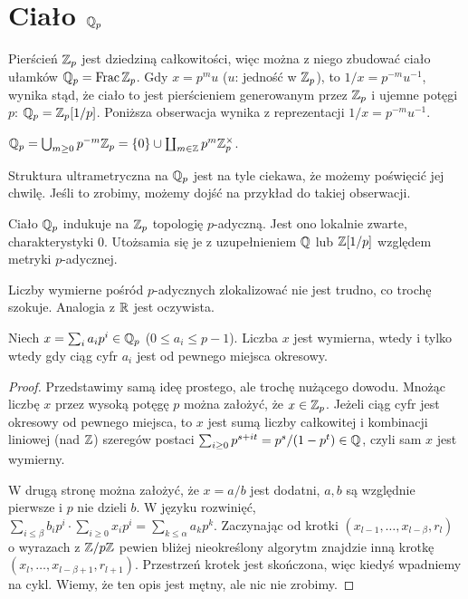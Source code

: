\section{Ciało $\mathbb Q_p$}
Pierścień  $\mathbb Z_p$ jest dziedziną całkowitości, więc można z niego zbudować ciało ułamków $\mathbb Q_p = \operatorname{Frac} \mathbb Z_p$.
Gdy $x = p^m u$ ($u$: jedność w $\mathbb Z_p$), to $1/x = p^{-m} u^{-1}$, wynika stąd, że ciało to jest pierścieniem generowanym przez $\mathbb Z_p$ i ujemne potęgi $p$: $\mathbb Q_p = \mathbb Z_p[1/p]$.
Poniższa obserwacja wynika z reprezentacji $1/x = p^{-m} u^{-1}$.

\begin{fakt}
	$\mathbb Q_p = \bigcup_{m \ge 0} p^{-m} \mathbb Z_p = \{0\} \cup \coprod_{m \in \mathbb Z} p^m \mathbb Z_p^\times$.
\end{fakt}

Struktura  ultrametryczna na $\mathbb Q_p$ jest na tyle ciekawa, że możemy poświęcić jej chwilę.
Jeśli to zrobimy, możemy dojść na przykład do takiej obserwacji.

\begin{fakt}
	Ciało $\mathbb Q_p$ indukuje na $\mathbb Z_p$ topologię $p$-adyczną.
	Jest ono lokalnie zwarte, charakterystyki $0$.
	Utożsamia się je z uzupełnieniem $\mathbb Q$ lub $\mathbb Z[1/p]$ względem metryki $p$-adycznej.
\end{fakt}

Liczby  wymierne pośród $p$-adycznych zlokalizować nie jest trudno, co trochę szokuje.
Analogia z $\mathbb R$ jest oczywista.

\begin{fakt}
	Niech $x = \sum_i a_i p^i \in \mathbb Q_p$ ($0 \le a_i \le p-1$).
	Liczba $x$ jest wymierna, wtedy i tylko wtedy gdy ciąg cyfr $a_i$ jest od pewnego miejsca okresowy.
\end{fakt}

\begin{proof}
	Przedstawimy samą ideę prostego, ale trochę nużącego dowodu.
	Mnożąc liczbę $x$ przez wysoką potęgę $p$ można założyć, że $x \in \mathbb Z_p$.
	Jeżeli ciąg cyfr jest okresowy od pewnego miejsca, to $x$ jest sumą liczby całkowitej i kombinacji liniowej (nad $\mathbb Z$) szeregów postaci $\sum_{i \ge 0} p^{s+it} = p^s / (1-p^t) \in \mathbb Q$, czyli sam $x$ jest wymierny.

	W drugą stronę można założyć, że $x = a/b$ jest dodatni, $a, b$ są względnie pierwsze i $p$ nie dzieli $b$.
	W języku rozwinięć, $\sum_{i \le \beta} b_i p^i \cdot \sum_{i \ge 0} x_i p^i = \sum_{k \le \alpha} a_kp^k$.
	Zaczynając od krotki $(x_{l-1}, \dots, x_{l - \beta}, r_l)$ o wyrazach z $\mathbb Z/p\mathbb Z$ pewien bliżej nieokreślony algorytm znajdzie inną krotkę $(x_{l}, \dots, x_{l - \beta+1}, r_{l+1})$.
	Przestrzeń krotek jest skończona, więc kiedyś wpadniemy na cykl.
	Wiemy, że ten opis jest mętny, ale nic nie zrobimy.
\end{proof}

